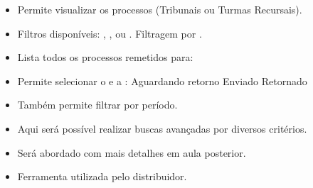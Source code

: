 \documentclass[letterpaper,10pt,brazil]{sphinxmanual}
\begin{document}
\begin{description}
\begin{itemize}
\end{itemize}

\begin{itemize}
\item {} 
\sphinxAtStartPar
Permite visualizar os processos  (Tribunais ou Turmas Recursais).

\item {} 
\sphinxAtStartPar
Filtros disponíveis:
\sphinxhyphen{} , , ou .
\sphinxhyphen{} Filtragem por .

\end{itemize}

\begin{itemize}
\item {} 
\sphinxAtStartPar
Lista todos os processos remetidos para:
\sphinxhyphen{} 
\sphinxhyphen{} 
\sphinxhyphen{} 
\sphinxhyphen{} 

\item {} 
\sphinxAtStartPar
Permite selecionar o  e a :
\sphinxhyphen{} Aguardando retorno
\sphinxhyphen{} Enviado
\sphinxhyphen{} Retornado

\item {} 
\sphinxAtStartPar
Também permite filtrar por período.

\end{itemize}

\begin{itemize}
\item {} 
\sphinxAtStartPar
Aqui será possível realizar buscas avançadas por diversos critérios.

\item {} 
\sphinxAtStartPar
Será abordado com mais detalhes em aula posterior.

\end{itemize}

\begin{itemize}
\item {} 
\sphinxAtStartPar
Ferramenta utilizada pelo distribuidor.


\end{itemize}
\end{description}
\end{document}
